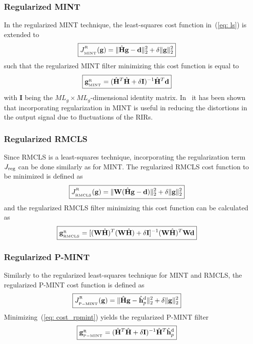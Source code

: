 \documentclass[10pt]{IEEEtran}
\begin{document}
\subsubsection*{Regularized MINT~\cite{Hikichi_EURASIP_2007}}
In the regularized MINT technique, the least-squares cost function in~(\ref{eq: ls}) is extended to
\begin{equation}
\label{eq: cost_rmint}
\boxed{J_{{}_{\rm MINT}}^{^{_{\rm R}}}(\mathbf{g}) = \|\hat{\mathbf{H}}\mathbf{g} - \mathbf{d}\|_2^2 + \delta \|\mathbf{g} \|_2^2}
\end{equation}
such that the regularized MINT filter minimizing this cost function is equal to
\begin{equation}
\label{eq: rmint_sgol}
\boxed{\mathbf{g}_{{}_{\rm MINT}}^{{_{\rm R}}}  = (\hat{\mathbf{H}}^T\hat{\mathbf{H}}+\delta \mathbf{I})^{-1}\hat{\mathbf{H}}^{T}\mathbf{d}}
\end{equation}
with $\mathbf{I}$ being the $ML_g\times ML_g$-dimensional identity matrix.
In~\cite{Hikichi_EURASIP_2007} it has been shown that incorporating regularization in MINT is useful in reducing the distortions in the output signal due to fluctuations of the RIRs.


\subsubsection*{Regularized RMCLS}
Since RMCLS is a least-squares technique, incorporating the regularization term $J_{\rm reg}$ can be done similarly as for MINT.
The regularized RMCLS cost function to be minimized is defined as
\begin{equation}
\label{eq: cost_rrmcls}
\boxed{J_{{}_{\rm RMCLS}}^{^{_{\rm R}}}(\mathbf{g}) =  \|\mathbf{W}({\hat{\mathbf{H}}}\mathbf{g} - \mathbf{d})\|_2^2 + \delta \|\mathbf{g} \|_2^2}
\end{equation}
and the regularized RMCLS filter minimizing this cost function can be calculated as
\begin{equation}
\boxed{\mathbf{g}_{{}_{\rm RMCLS}}^{{_{\rm R}}}  = [(\mathbf{W}\hat{\mathbf{H}})^T(\mathbf{W}\hat{\mathbf{H}}) + \delta \mathbf{I}]^{-1} (\mathbf{W}\hat{\mathbf{H}})^T \mathbf{W}\mathbf{d}}
\end{equation}

\subsubsection*{Regularized P-MINT}
Similarly to the regularized least-squares technique for MINT and RMCLS, the regularized P-MINT cost function is defined as
\begin{equation}
\label{eq: cost_rpmint}
\boxed{J_{{}_{\rm P-MINT}} ^{^{_{\rm R}}}(\mathbf{g}) = \|\hat{\mathbf{H}}\mathbf{g} - \hat{\mathbf{h}}_p^{\rm d}\|_2^2 + \delta \|\mathbf{g} \|_2^2}
\end{equation}
Minimizing~(\ref{eq: cost_rpmint}) yields the regularized P-MINT filter
\begin{equation}
\label{eq: rpmintsol}
\boxed{\mathbf{g}_{{}_{\rm P-MINT}}^{{_{\rm R}}}  = (\hat{\mathbf{H}}^T\hat{\mathbf{H}}+\delta \mathbf{I})^{-1}\hat{\mathbf{H}}^{T}\hat{\mathbf{h}}_p^{\rm d}}
\end{equation}
\end{document}
